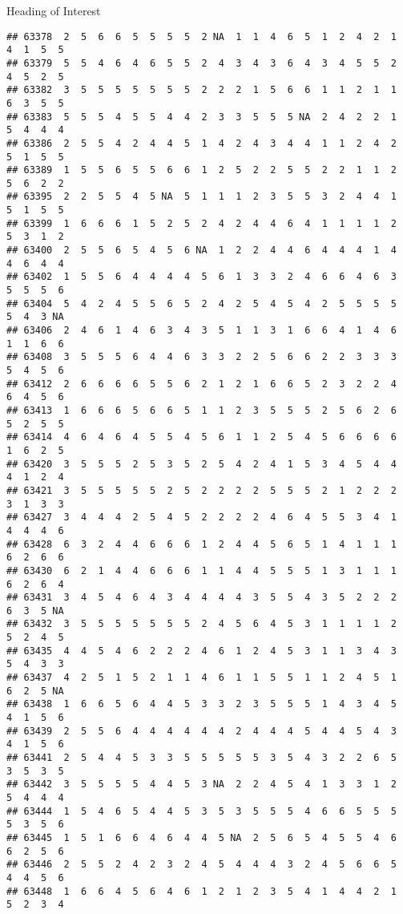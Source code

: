 \documentclass[
  ignorenonframetext,
]{beamer}
\begin{document}
\begin{frame}[fragile]{Heading of Interest}
\begin{verbatim}
## 63378  2  5  6  6  5  5  5  5  2 NA  1  1  4  6  5  1  2  4  2  1  4  1  5  5
## 63379  5  5  4  6  4  6  5  5  2  4  3  4  3  6  4  3  4  5  5  2  4  5  2  5
## 63382  3  5  5  5  5  5  5  5  2  2  2  1  5  6  6  1  1  2  1  1  6  3  5  5
## 63383  5  5  5  4  5  5  4  4  2  3  3  5  5  5 NA  2  4  2  2  1  5  4  4  4
## 63386  2  5  5  4  2  4  4  5  1  4  2  4  3  4  4  1  1  2  4  2  5  1  5  5
## 63389  1  5  5  6  5  5  6  6  1  2  5  2  2  5  5  2  2  1  1  2  5  6  2  2
## 63395  2  2  5  5  4  5 NA  5  1  1  1  2  3  5  5  3  2  4  4  1  5  1  5  5
## 63399  1  6  6  6  1  5  2  5  2  4  2  4  4  6  4  1  1  1  1  2  5  3  1  2
## 63400  2  5  5  6  5  4  5  6 NA  1  2  2  4  4  6  4  4  4  1  4  4  6  4  4
## 63402  1  5  5  6  4  4  4  4  5  6  1  3  3  2  4  6  6  4  6  3  5  5  5  6
## 63404  5  4  2  4  5  5  6  5  2  4  2  5  4  5  4  2  5  5  5  5  5  4  3 NA
## 63406  2  4  6  1  4  6  3  4  3  5  1  1  3  1  6  6  4  1  4  6  1  1  6  6
## 63408  3  5  5  5  6  4  4  6  3  3  2  2  5  6  6  2  2  3  3  3  5  4  5  6
## 63412  2  6  6  6  6  5  5  6  2  1  2  1  6  6  5  2  3  2  2  4  6  4  5  6
## 63413  1  6  6  6  5  6  6  5  1  1  2  3  5  5  5  2  5  6  2  6  5  2  5  5
## 63414  4  6  4  6  4  5  5  4  5  6  1  1  2  5  4  5  6  6  6  6  1  6  2  5
## 63420  3  5  5  5  2  5  3  5  2  5  4  2  4  1  5  3  4  5  4  4  4  1  2  4
## 63421  3  5  5  5  5  5  2  5  2  2  2  2  5  5  5  2  1  2  2  2  3  1  3  3
## 63427  3  4  4  4  2  5  4  5  2  2  2  2  4  6  4  5  5  3  4  1  4  4  4  6
## 63428  6  3  2  4  4  6  6  6  1  2  4  4  5  6  5  1  4  1  1  1  6  2  6  6
## 63430  6  2  1  4  4  6  6  6  1  1  4  4  5  5  5  1  3  1  1  1  6  2  6  4
## 63431  3  4  5  4  6  4  3  4  4  4  4  3  5  5  4  3  5  2  2  2  6  3  5 NA
## 63432  3  5  5  5  5  5  5  5  2  4  5  6  4  5  3  1  1  1  1  2  5  2  4  5
## 63435  4  4  5  4  6  2  2  2  4  6  1  2  4  5  3  1  1  3  4  3  5  4  3  3
## 63437  4  2  5  1  5  2  1  1  4  6  1  1  5  5  1  1  2  4  5  1  6  2  5 NA
## 63438  1  6  6  5  6  4  4  5  3  3  2  3  5  5  5  1  4  3  4  5  4  1  5  6
## 63439  2  5  5  6  4  4  4  4  4  4  2  4  4  4  5  4  4  5  4  3  4  1  5  6
## 63441  2  5  4  4  5  3  3  5  5  5  5  5  3  5  4  3  2  2  6  5  3  5  3  5
## 63442  3  5  5  5  5  4  4  5  3 NA  2  2  4  5  4  1  3  3  1  2  5  4  4  4
## 63444  1  5  4  6  5  4  4  5  3  5  3  5  5  5  4  6  6  5  5  5  5  3  5  6
## 63445  1  5  1  6  6  4  6  4  4  5 NA  2  5  6  5  4  5  5  4  6  6  2  5  6
## 63446  2  5  5  2  4  2  3  2  4  5  4  4  4  3  2  4  5  6  6  5  4  4  5  6
## 63448  1  6  6  4  5  6  4  6  1  2  1  2  3  5  4  1  4  4  2  1  5  2  3  4

\end{verbatim}
\end{frame}
\end{document}
